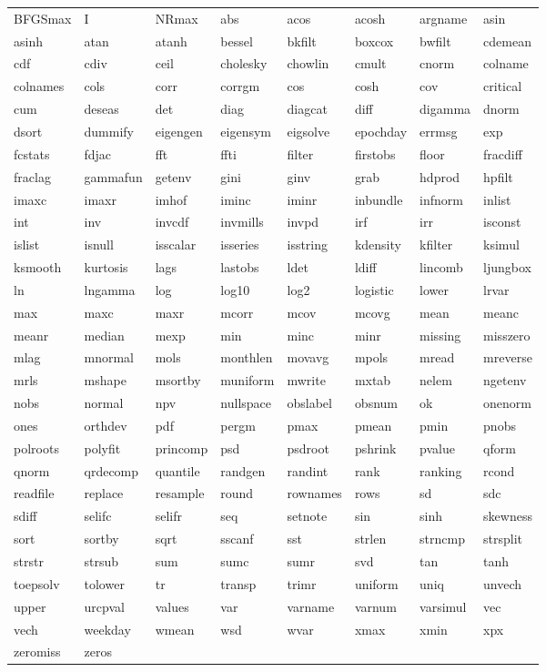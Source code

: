 \begin{tabular}{llllllll}
BFGSmax & I & NRmax & abs & acos & acosh & argname & asin \\
asinh & atan & atanh & bessel & bkfilt & boxcox & bwfilt & cdemean \\
cdf & cdiv & ceil & cholesky & chowlin & cmult & cnorm & colname \\
colnames & cols & corr & corrgm & cos & cosh & cov & critical \\
cum & deseas & det & diag & diagcat & diff & digamma & dnorm \\
dsort & dummify & eigengen & eigensym & eigsolve & epochday & errmsg & exp \\
fcstats & fdjac & fft & ffti & filter & firstobs & floor & fracdiff \\
fraclag & gammafun & getenv & gini & ginv & grab & hdprod & hpfilt \\
imaxc & imaxr & imhof & iminc & iminr & inbundle & infnorm & inlist \\
int & inv & invcdf & invmills & invpd & irf & irr & isconst \\
islist & isnull & isscalar & isseries & isstring & kdensity & kfilter & ksimul \\
ksmooth & kurtosis & lags & lastobs & ldet & ldiff & lincomb & ljungbox \\
ln & lngamma & log & log10 & log2 & logistic & lower & lrvar \\
max & maxc & maxr & mcorr & mcov & mcovg & mean & meanc \\
meanr & median & mexp & min & minc & minr & missing & misszero \\
mlag & mnormal & mols & monthlen & movavg & mpols & mread & mreverse \\
mrls & mshape & msortby & muniform & mwrite & mxtab & nelem & ngetenv \\
nobs & normal & npv & nullspace & obslabel & obsnum & ok & onenorm \\
ones & orthdev & pdf & pergm & pmax & pmean & pmin & pnobs \\
polroots & polyfit & princomp & psd & psdroot & pshrink & pvalue & qform \\
qnorm & qrdecomp & quantile & randgen & randint & rank & ranking & rcond \\
readfile & replace & resample & round & rownames & rows & sd & sdc \\
sdiff & selifc & selifr & seq & setnote & sin & sinh & skewness \\
sort & sortby & sqrt & sscanf & sst & strlen & strncmp & strsplit \\
strstr & strsub & sum & sumc & sumr & svd & tan & tanh \\
toepsolv & tolower & tr & transp & trimr & uniform & uniq & unvech \\
upper & urcpval & values & var & varname & varnum & varsimul & vec \\
vech & weekday & wmean & wsd & wvar & xmax & xmin & xpx \\
zeromiss & zeros & \\
\end{tabular}

